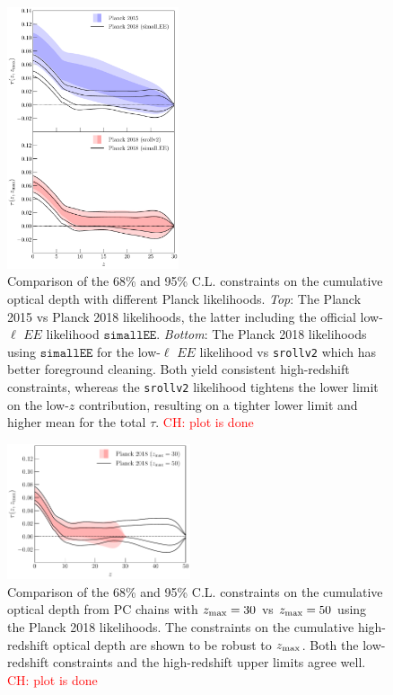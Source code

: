 \documentclass[prd,twocolumn,amsmath,amssymb,floatfix,superscriptaddress,nofootinbib]{revtex4-1}
\newcommand{\zmax}{z_{\rm max}}
\newcommand{\ch}[1]{\textcolor{red}{#1}}
\begin{document}
\begin{figure}[ht]
\includegraphics[width=0.45\textwidth]{paper/plots/pl18_taugtz_pc_zmax30_pl15_vs_pl18_simallEE_vs_pl18_srollv2.pdf}
\caption{Comparison of the 68\% and 95\% C.L. constraints on the cumulative optical depth with different Planck likelihoods. \textit{Top}: The Planck 2015 vs Planck 2018 likelihoods, the latter including the official low-$\ell$ $EE$ likelihood $\texttt{simallEE}$. \textit{Bottom}: The Planck 2018 likelihoods using $\texttt{simallEE}$ for the low-$\ell$ $EE$ likelihood vs \texttt{srollv2} which has better foreground cleaning. Both yield consistent high-redshift constraints, whereas the \texttt{srollv2} likelihood tightens the lower limit on the low-$z$ contribution, resulting on a tighter lower limit and higher mean for the total $\tau$. \ch{CH: plot is done}
}
\label{fig:plot_taugtz_2015_vs_2018_simallEE_vs_2018_srollv2}
\end{figure}


\begin{figure}[ht]
\includegraphics[width=0.48\textwidth]{paper/plots/pl18_taugtz_pl18_srollv2_pc_zmax30_vs_zmax50.pdf}
\caption{Comparison of the 68\% and 95\% C.L. constraints on the cumulative optical depth from PC chains with $\zmax = 30$ vs $\zmax = 50$ using the Planck 2018 likelihoods. The constraints on the cumulative high-redshift optical depth are shown to be robust to $\zmax$. Both the low-redshift constraints and the high-redshift upper limits agree well. \ch{CH: plot is done}
}
\label{fig:plot_taugtz_zmax30_vs_zmax50}
\end{figure}
\end{document}
